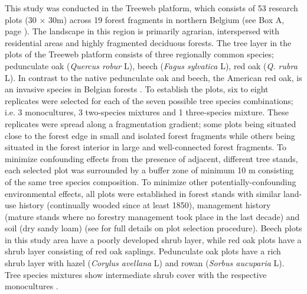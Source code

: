 \documentclass[10pt, twoside]{book} %
\begin{document}
		This study was conducted in the Treeweb platform, which consists of 53 research plots (30 $\times$ 30m) across 19 forest fragments in northern Belgium (see Box A, page \pageref{boxa}). The landscape in this region is primarily agrarian, interspersed with residential areas and highly fragmented deciduous forests. The tree layer in the plots of the Treeweb platform consists of three regionally common species; pedunculate oak (\textit{Quercus robur} L), beech (\textit{Fagus sylvatica} L), red oak (\textit{Q. rubra} L). In contrast to the native pedunculate oak and beech, the American red oak, is an invasive species in Belgian forests \citep{Branquart2007}. To establish the plots, six to eight replicates were selected for each of the seven possible tree species combinations; i.e. 3 monocultures, 3 two-species mixtures and 1 three-species mixture. These replicates were spread along a fragmentation gradient; some plots being situated close to the forest edge in small and isolated forest fragments while others being situated in the forest interior in large and well-connected forest fragments. To minimize confounding effects from the presence of adjacent, different tree stands, each selected plot was surrounded by a buffer zone of minimum 10 m consisting of the same tree species composition. To minimize other potentially-confounding environmental effects, all plots were established in forest stands with similar land-use history (continually wooded since at least 1850), management history (mature stands where no forestry management took place in the last decade) and soil (dry sandy loam) (see \citealt{DeGroote2017} for full details on plot selection procedure). Beech plots in this study area have a poorly developed shrub layer, while red oak plots have a shrub layer consisting of red oak saplings. Pedunculate oak plots have a rich shrub layer with hazel (\textit{Corylus avellana} L) and rowan (\textit{Sorbus aucuparia} L). Tree species mixtures show intermediate shrub cover with the respective monocultures \citep{DeGroote2017}.\\
		
\end{document}
